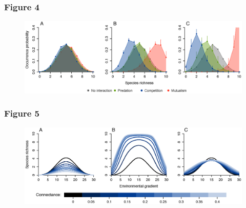 \newpage

%
\subsubsection*{Figure 4}
\begin{figure}[h!]
\centering
\includegraphics [width=\textwidth]{./chapitre1/fig4.eps}
\caption{}
\label{fig4}
\end{figure}

\newpage

%
\subsubsection*{Figure 5}
\begin{figure}[h!]
\centering
\includegraphics [width=\textwidth]{./chapitre1/fig5.eps}
\caption{}
\label{fig5}
\end{figure}
